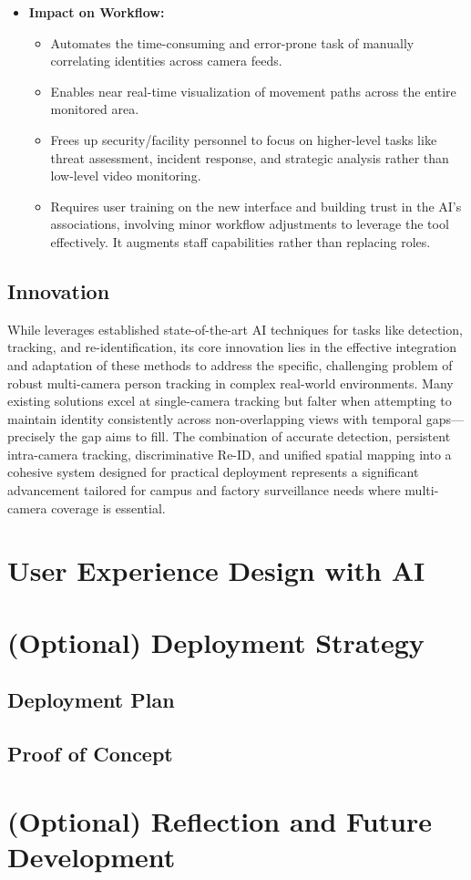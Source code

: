 \begin{itemize}
    \item \textbf{Impact on Workflow:}
        \begin{itemize}
            \item Automates the time-consuming and error-prone task of manually correlating identities across camera feeds.
            \item Enables near real-time visualization of movement paths across the entire monitored area.
            \item Frees up security/facility personnel to focus on higher-level tasks like threat assessment, incident response, and strategic analysis rather than low-level video monitoring.
            \item Requires user training on the new interface and building trust in the AI's associations, involving minor workflow adjustments to leverage the tool effectively. It augments staff capabilities rather than replacing roles.
        \end{itemize}
\end{itemize}


\subsection{Innovation}
\label{subsection:ai-innovation}
While \usevar{\srsTitle} leverages established state-of-the-art AI techniques for tasks like detection, tracking, and re-identification, its core innovation lies in the effective integration and adaptation of these methods to address the specific, challenging problem of robust multi-camera person tracking in complex real-world environments. Many existing solutions excel at single-camera tracking but falter when attempting to maintain identity consistently across non-overlapping views with temporal gaps—precisely the gap \usevar{\srsTitle} aims to fill. The combination of accurate detection, persistent intra-camera tracking, discriminative Re-ID, and unified spatial mapping into a cohesive system designed for practical deployment represents a significant advancement tailored for campus and factory surveillance needs where multi-camera coverage is essential.

\section{User Experience Design with AI}
\label{section:ai-ux}

\section{(Optional) Deployment Strategy}
\label{section:ai-deployment}

\subsection{Deployment Plan}

\subsection{Proof of Concept}

\section{(Optional) Reflection and Future Development}
\label{section:ai-reflection}

